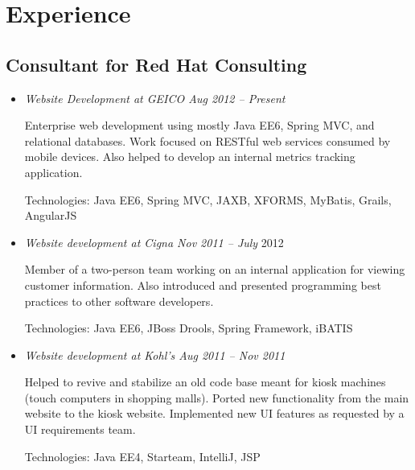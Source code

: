 \documentclass[a4paper,11pt]{article}
\begin{document}

\section*{Experience}

\subsection*{Consultant for Red Hat Consulting}

  \vskip 5pt
  \begin{itemize}

    \item \textit{Website Development at GEICO \hfill Aug 2012 -- Present}

      Enterprise web development using mostly Java EE6, Spring MVC, and
      relational databases. Work focused on RESTful web services consumed by
      mobile devices. Also helped to develop an internal metrics tracking
      application.

      Technologies: Java EE6, Spring MVC, JAXB, XFORMS, MyBatis, Grails,
      AngularJS


    \item \textit{Website development at Cigna \hfill Nov 2011 -- July}
      2012

      Member of a two-person team working on an internal application for viewing
      customer information. Also introduced and presented programming best
      practices to other software developers.

      Technologies: Java EE6, JBoss Drools, Spring Framework, iBATIS

    \item \textit{Website development at Kohl's \hfill Aug 2011 -- Nov 2011}

      Helped to revive and stabilize an old code base meant for kiosk machines
      (touch computers in shopping malls). Ported new functionality from the
      main website to the kiosk website. Implemented new UI features as
      requested by a UI requirements team.

      Technologies: Java EE4, Starteam, IntelliJ, JSP

  \end{itemize}
\end{document}

